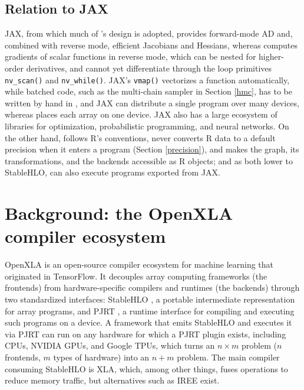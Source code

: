 \subsection{Relation to JAX}\label{relation-jax}

JAX, from which much of 's design is adopted, provides forward-mode AD and, combined with reverse mode, efficient Jacobians and Hessians, whereas  computes gradients of scalar functions in reverse mode, which can be nested for higher-order derivatives, and cannot yet differentiate through the loop primitives \texttt{nv\_scan()} and \texttt{nv\_while()}.
JAX's \texttt{vmap()} vectorizes a function automatically, while batched code, such as the multi-chain sampler in Section \ref{hmc}, has to be written by hand in , and JAX can distribute a single program over many devices, whereas  places each array on one device.
JAX also has a large ecosystem of libraries for optimization, probabilistic programming, and neural networks.
On the other hand,  follows R's conventions, never converts R data to a default precision when it enters a program (Section \ref{precision}), and makes the graph, its transformations, and the backends accessible as R objects; and as both lower to StableHLO,  can also execute programs exported from JAX.

\section{Background: the OpenXLA compiler ecosystem}\label{background}

OpenXLA \citep{ref-openxla} is an open-source compiler ecosystem for machine learning that originated in TensorFlow.
It decouples array computing frameworks (the frontends) from hardware-specific compilers and runtimes (the backends) through two standardized interfaces: StableHLO \citep{ref-stablehlo}, a portable intermediate representation for array programs, and PJRT \citep{ref-pjrt}, a runtime interface for compiling and executing such programs on a device.
A framework that emits StableHLO and executes it via PJRT can run on any hardware for which a PJRT plugin exists, including CPUs, NVIDIA GPUs, and Google TPUs, which turns an \(n \times m\) problem (\(n\) frontends, \(m\) types of hardware) into an \(n + m\) problem.
The main compiler consuming StableHLO is XLA, which, among other things, fuses operations to reduce memory traffic, but alternatives such as IREE \citep{ref-iree} exist.


